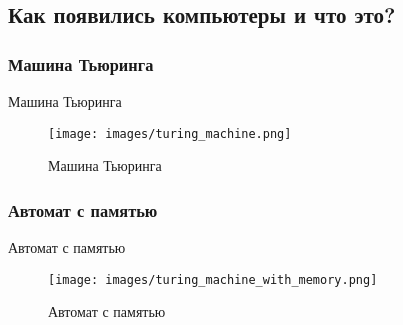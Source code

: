 \documentclass{beamer}
\begin{document}
\subsection{Как появились компьютеры и что это?}
    \subsubsection{Машина Тьюринга}
    \begin{frame}{Машина Тьюринга}
        \begin{figure}[H]
            \centering
            \texttt{[image: images/turing\_machine.png]}
            \caption{Машина Тьюринга}
        \end{figure}
    \end{frame}

\subsubsection{Автомат с памятью}
\begin{frame}{Автомат с памятью}
    \begin{figure}[H]
        \centering
        \texttt{[image: images/turing\_machine\_with\_memory.png]}
        \caption{Автомат с памятью}
    \end{figure}
\end{frame}
\end{document}
